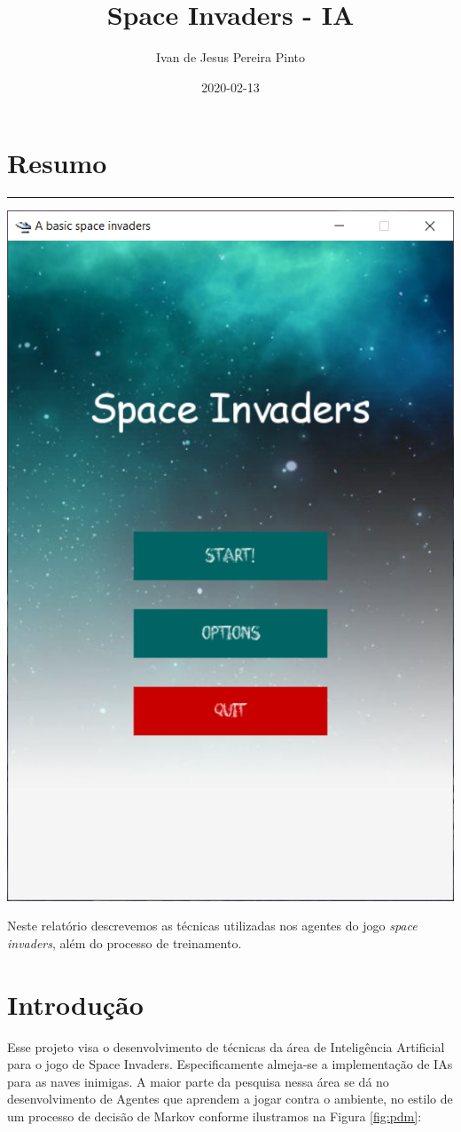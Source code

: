 \documentclass[]{book}
\title{Space Invaders - IA}
\author{Ivan de Jesus Pereira Pinto}
\date{2020-02-13}
\begin{document}
\maketitle

{
\setcounter{tocdepth}{1}
\tableofcontents
}
\chapter*{Resumo}\label{resumo}

\begin{center}\rule{0.5\linewidth}{0.5pt}\end{center}

\begin{center}\includegraphics[width=0.5\linewidth]{content/imgs/game} \end{center}

Neste relatório descrevemos as técnicas utilizadas nos agentes do jogo
\emph{space invaders}, além do processo de treinamento.

\chapter{Introdução}\label{intro}

Esse projeto visa o desenvolvimento de técnicas da área de Inteligência
Artificial para o jogo de Space Invaders. Especificamente almeja-se a
implementação de IAs para as naves inimigas. A maior parte da pesquisa
nessa área se dá no desenvolvimento de Agentes que aprendem a jogar
contra o ambiente, no estilo de um processo de decisão de Markov
conforme ilustramos na Figura \ref{fig:pdm}:
\end{document}
